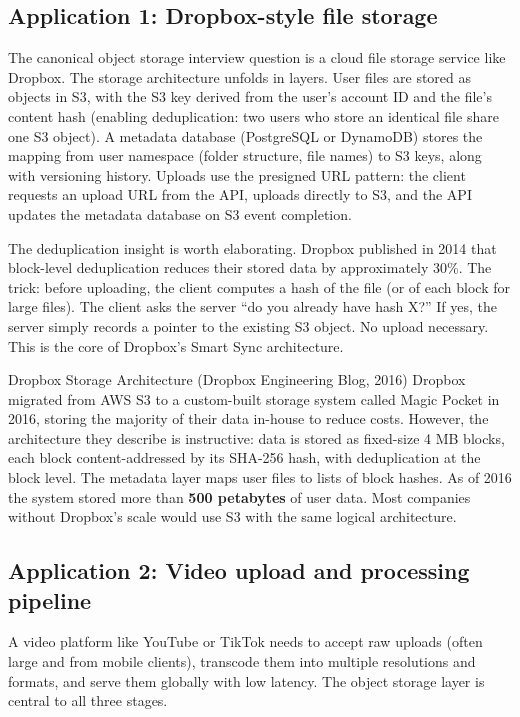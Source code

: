 \documentclass[11pt,a4paper]{article}
\begin{document}
\subsection{Application 1: Dropbox-style file storage}

The canonical object storage interview question is a cloud file storage service like Dropbox. The storage architecture unfolds in layers. User files are stored as objects in S3, with the S3 key derived from the user's account ID and the file's content hash (enabling deduplication: two users who store an identical file share one S3 object). A metadata database (PostgreSQL or DynamoDB) stores the mapping from user namespace (folder structure, file names) to S3 keys, along with versioning history. Uploads use the presigned URL pattern: the client requests an upload URL from the API, uploads directly to S3, and the API updates the metadata database on S3 event completion.

The deduplication insight is worth elaborating. Dropbox published in 2014 that block-level deduplication reduces their stored data by approximately 30\%. The trick: before uploading, the client computes a hash of the file (or of each block for large files). The client asks the server ``do you already have hash X?'' If yes, the server simply records a pointer to the existing S3 object. No upload necessary. This is the core of Dropbox's Smart Sync architecture.

\begin{industrybox}{Dropbox Storage Architecture (Dropbox Engineering Blog, 2016)}
Dropbox migrated from AWS S3 to a custom-built storage system called Magic Pocket in 2016, storing the majority of their data in-house to reduce costs. However, the architecture they describe is instructive: data is stored as fixed-size 4 MB blocks, each block content-addressed by its SHA-256 hash, with deduplication at the block level. The metadata layer maps user files to lists of block hashes. As of 2016 the system stored more than \textbf{500 petabytes} of user data. Most companies without Dropbox's scale would use S3 with the same logical architecture.
\end{industrybox}

\subsection{Application 2: Video upload and processing pipeline}

A video platform like YouTube or TikTok needs to accept raw uploads (often large and from mobile clients), transcode them into multiple resolutions and formats, and serve them globally with low latency. The object storage layer is central to all three stages.
\end{document}

